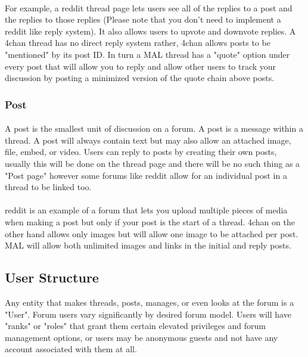 \documentclass[]{article}
\begin{document}
\paragraph{}
For example, a reddit thread page lets users see all of the replies to a post and the replies to those replies (Please note that you don't need to implement a reddit like reply system). It also allows users to upvote and downvote replies. A 4chan thread has no direct reply system rather, 4chan allows posts to be "mentioned" by its post ID. In turn a MAL thread has a "quote" option under every post that will allow you to reply and allow other users to track your discussion by posting a minimized version of the quote chain above posts.    

\subsubsection{Post}\label{post}
\paragraph{}
A post is the smallest unit of discussion on a forum. A post is a message within a thread. A post will always contain text but may also allow an attached image, file, embed, or video. Users can reply to posts by creating their own posts, usually this will be done on the thread page and there will be no such thing as a "Post page" however some forums like reddit allow for an individual post in a thread to be linked too. 
\paragraph{}
reddit is an example of a forum that lets you upload multiple pieces of media when making a post but only if your post is the start of a thread. 4chan on the other hand allows only images but will allow one image to  be attached per post. MAL will allow both unlimited images and links in the initial and reply posts.

\subsection{User Structure}\label{usrStruct}
Any entity that makes threads, posts, manages, or even looks at the forum is a "User". Forum users vary significantly by desired forum model. Users will have "ranks" or "roles" that grant them certain elevated privileges and forum management options, or users may be anonymous guests and not have any account associated with them at all. 
\end{document}
